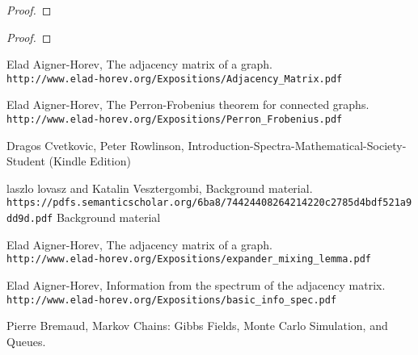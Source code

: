 \documentclass[a4paper, 11pt, oneside]{article}
\newenvironment{problem}[1]
  {\renewcommand\theinnercustomprob{#1}\innercustomprob}
  {\endinnercustomprob}
\begin{document}
 \begin{problem}{10}\label{problem10}
\end{problem}
\begin{proof}

\end{proof}		

 \begin{problem}{11}\label{problem11}
\end{problem}
\begin{proof}

\end{proof}		

\begin{thebibliography}{9} 
Elad Aigner-Horev,
The adjacency matrix of a graph.
\\\texttt{http://www.elad-horev.org/Expositions/Adjacency\_Matrix.pdf}

Elad Aigner-Horev,
The Perron-Frobenius theorem for connected graphs.
\\\texttt{http://www.elad-horev.org/Expositions/Perron\_Frobenius.pdf}

Dragos Cvetkovic, Peter Rowlinson,
Introduction-Spectra-Mathematical-Society-Student (Kindle Edition)

laszlo lovasz and Katalin Vesztergombi,
Background material.
\\\texttt{https://pdfs.semanticscholar.org/6ba8/74424408264214220c2785d4bdf521a9dd9d.pdf}
Background material

Elad Aigner-Horev,
The adjacency matrix of a graph.
\\\texttt{http://www.elad-horev.org/Expositions/expander\_mixing\_lemma.pdf}

Elad Aigner-Horev,
Information from the spectrum of the adjacency matrix.
\\\texttt{http://www.elad-horev.org/Expositions/basic\_info\_spec.pdf}

Pierre Bremaud,
Markov Chains: Gibbs Fields, Monte Carlo Simulation, and Queues.
\end{thebibliography}
\end{document}
